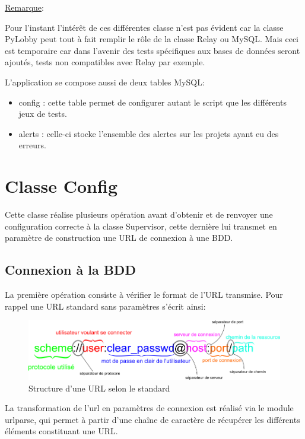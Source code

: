\underline{Remarque}:

Pour l'instant l'intérêt de ces différentes classe n'est pas évident car la classe PyLobby peut tout à fait remplir le rôle de la classe Relay ou MySQL. Mais ceci est temporaire car dans l'avenir des tests spécifiques aux bases de données seront ajoutés, tests non compatibles avec Relay par exemple.

L'application se compose aussi de deux tables MySQL:

\begin{itemize}
	\item{config} : cette table permet de configurer autant le script que les différents jeux de tests.
	\item{alerts} : celle-ci stocke l'ensemble des alertes sur les projets ayant eu des erreurs.
\end{itemize}

\newpage

\section*{Classe Config}

Cette classe réalise plusieurs opération avant d'obtenir et de renvoyer une configuration correcte à la classe Supervisor, cette dernière lui transmet en paramètre de construction une URL de connexion à une BDD.

\subsection*{Connexion à la BDD}

La première opération consiste à vérifier le format de l'URL transmise. Pour rappel une URL standard sans paramètres s'écrit ainsi:


\begin{figure}[h!]
	\centering
	\includegraphics[scale=0.5]{images/url.png}
	\caption{Structure d'une URL selon le standard}
\end{figure}


La transformation de l'url en paramètres de connexion est réalisé via le module urlparse, qui permet à partir d'une chaîne de caractère de récupérer les différents éléments constituant une URL.

